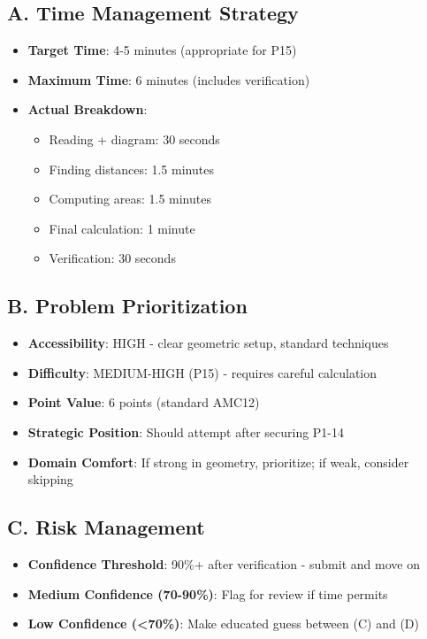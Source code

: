 \documentclass[]{article}
\begin{document}
\begin{competitionbox}
\subsection*{A. Time Management Strategy}
\begin{itemize}[leftmargin=*]
    \item \textbf{Target Time}: 4-5 minutes (appropriate for P15)
    \item \textbf{Maximum Time}: 6 minutes (includes verification)
    \item \textbf{Actual Breakdown}:
    \begin{itemize}
        \item Reading + diagram: 30 seconds
        \item Finding distances: 1.5 minutes
        \item Computing areas: 1.5 minutes
        \item Final calculation: 1 minute
        \item Verification: 30 seconds
    \end{itemize}
\end{itemize}

\subsection*{B. Problem Prioritization}
\begin{itemize}[leftmargin=*]
    \item \textbf{Accessibility}: HIGH - clear geometric setup, standard techniques
    \item \textbf{Difficulty}: MEDIUM-HIGH (P15) - requires careful calculation
    \item \textbf{Point Value}: 6 points (standard AMC12)
    \item \textbf{Strategic Position}: Should attempt after securing P1-14
    \item \textbf{Domain Comfort}: If strong in geometry, prioritize; if weak, consider skipping
\end{itemize}

\subsection*{C. Risk Management}
\begin{itemize}[leftmargin=*]
    \item \textbf{Confidence Threshold}: 90\%+ after verification - submit and move on
    \item \textbf{Medium Confidence (70-90\%)}: Flag for review if time permits
    \item \textbf{Low Confidence (<70\%)}: Make educated guess between (C) and (D)
\end{itemize}


\end{competitionbox}
\end{document}
